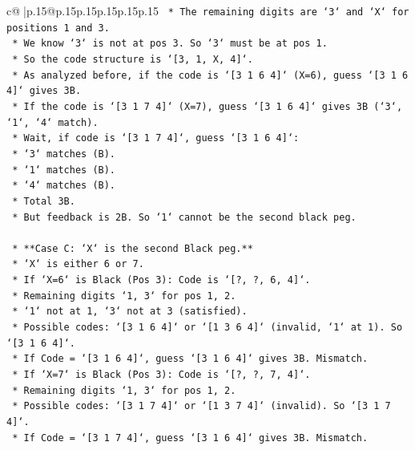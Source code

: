 \documentclass{article}
\begin{document}
{\begin{supertabular}{c@{$\;$}|p{.15\linewidth}@{}p{.15\linewidth}p{.15\linewidth}p{.15\linewidth}p{.15\linewidth}p{.15\linewidth}}
{{{\texttt{            *   The remaining digits are `3` and `X` for positions 1 and 3.} \\
\texttt{            *   We know `3` is not at pos 3. So `3` must be at pos 1.} \\
\texttt{            *   So the code structure is `{[}3, 1, X, 4{]}`.} \\
\texttt{            *   As analyzed before, if the code is `{[}3 1 6 4{]}` (X=6), guess `{[}3 1 6 4{]}` gives 3B.} \\
\texttt{            *   If the code is `{[}3 1 7 4{]}` (X=7), guess `{[}3 1 6 4{]}` gives 3B (`3`, `1`, `4` match).} \\
\texttt{            *   Wait, if code is `{[}3 1 7 4{]}`, guess `{[}3 1 6 4{]}`:} \\
\texttt{                *   `3` matches (B).} \\
\texttt{                *   `1` matches (B).} \\
\texttt{                *   `4` matches (B).} \\
\texttt{                *   Total 3B.} \\
\texttt{            *   But feedback is 2B. So `1` cannot be the second black peg.} \\
\\ 
\texttt{        *   **Case C: `X` is the second Black peg.**} \\
\texttt{            *   `X` is either 6 or 7.} \\
\texttt{            *   If `X=6` is Black (Pos 3): Code is `{[}?, ?, 6, 4{]}`.} \\
\texttt{                *   Remaining digits `1, 3` for pos 1, 2.} \\
\texttt{                *   `1` not at 1, `3` not at 3 (satisfied).} \\
\texttt{                *   Possible codes: `{[}3 1 6 4{]}` or `{[}1 3 6 4{]}` (invalid, `1` at 1). So `{[}3 1 6 4{]}`.} \\
\texttt{                *   If Code = `{[}3 1 6 4{]}`, guess `{[}3 1 6 4{]}` gives 3B. Mismatch.} \\
\texttt{            *   If `X=7` is Black (Pos 3): Code is `{[}?, ?, 7, 4{]}`.} \\
\texttt{                *   Remaining digits `1, 3` for pos 1, 2.} \\
\texttt{                *   Possible codes: `{[}3 1 7 4{]}` or `{[}1 3 7 4{]}` (invalid). So `{[}3 1 7 4{]}`.} \\
\texttt{                *   If Code = `{[}3 1 7 4{]}`, guess `{[}3 1 6 4{]}` gives 3B. Mismatch.} \\
}}}
\end{supertabular}}
\end{document}
